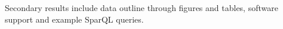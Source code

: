 																																																																																																																																																																																																																																																																																																																																																																																																															Secondary results include data outline through figures and tables,
																																																																																																																																																																																																																																																																																																																																																																																																															software support and example SparQL queries.

